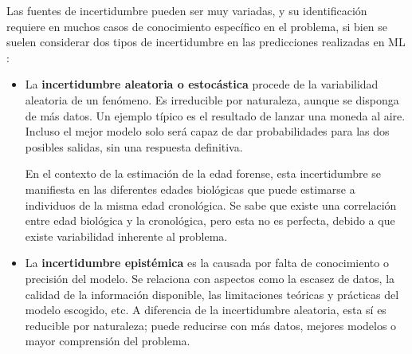 Las fuentes de incertidumbre pueden ser muy variadas, y su identificación requiere en muchos casos de 
conocimiento específico en el problema, si bien se suelen considerar dos tipos de incertidumbre en las 
predicciones realizadas en ML \cite{hullermeier2021, nemani2023}:

\begin{itemize}
    
    \item La \textbf{incertidumbre aleatoria o estocástica} procede de la variabilidad aleatoria de un 
    fenómeno. 
    Es irreducible por naturaleza, aunque se disponga de más datos. 
    Un ejemplo típico es el resultado de lanzar una moneda al aire. Incluso el mejor modelo solo será capaz de 
    dar probabilidades para las dos posibles salidas, sin una respuesta definitiva. 
    

    En el contexto de la estimación de la edad forense, esta incertidumbre se manifiesta en las diferentes 
    edades biológicas que puede estimarse a individuos de la misma edad cronológica.
    Se sabe que existe una correlación entre edad biológica y la cronológica, pero esta no es perfecta, 
    debido a que existe variabilidad inherente al problema.

        
        
    


    \item La \textbf{incertidumbre epistémica} es la causada por falta de conocimiento o precisión del modelo.
    Se relaciona con aspectos como la escasez de datos, la calidad de la información disponible, las 
    limitaciones teóricas y prácticas del modelo escogido, etc. 
    A diferencia de la incertidumbre aleatoria, esta sí es reducible por naturaleza; puede reducirse con más
    datos, mejores modelos o mayor comprensión del problema. 
    
\end{itemize}

